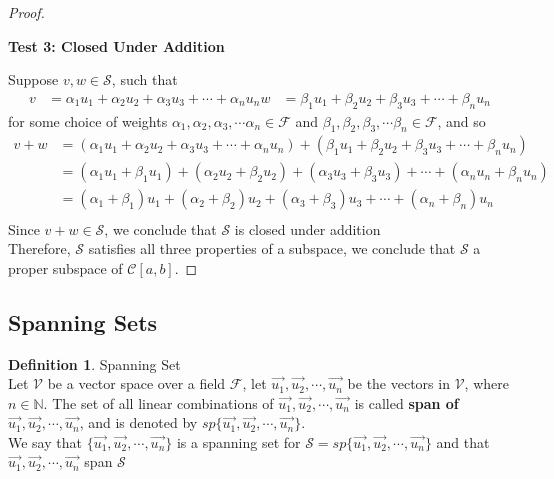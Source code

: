 \documentclass{book}
\theoremstyle{definition}
\newtheorem{definition}{Definition}[section]
\theoremstyle{remark}
\newcommand{\bb}[1]{\mathbb{#1}}
\newcommand{\cc}[1]{\mathcal{#1}}
\begin{document}
\begin{proof}
        \begin{flushleft} \textbf{Test 3: Closed Under Addition} \end{flushleft}
            Suppose $v, w \in \cc{S}$, such that 
                \begin{align*}
                    v & = \alpha_1 u_1 + \alpha_2 u_2 + \alpha_3 u_3 + \cdots + \alpha_n u_n
                    w & = \beta_1 u_1 + \beta_2 u_2 + \beta_3 u_3 + \cdots + \beta_n u_n
                \end{align*}
            for some choice of weights $\alpha_1, \alpha_2, \alpha_3, \cdots \alpha_n \in \cc{F}$ and $\beta_1, \beta_2, \beta_3, \cdots \beta_n \in \cc{F}$, and so
                \begin{align*}
                    v + w & = (\alpha_1 u_1 + \alpha_2 u_2 + \alpha_3 u_3 + \cdots + \alpha_n u_n) + (\beta_1 u_1 + \beta_2 u_2 + \beta_3 u_3 + \cdots + \beta_n u_n) \\
                        & = (\alpha_1 u_1 + \beta_1 u_1) + (\alpha_2 u_2 + \beta_2 u_2) + (\alpha_3 u_3 + \beta_3 u_3) + \cdots + (\alpha_n u_n + \beta_n u_n) \\
                        & = (\alpha_1 + \beta_1) u_1 + (\alpha_2 + \beta_2) u_2 + (\alpha_3 + \beta_3) u_3 + \cdots + (\alpha_n + \beta_n) u_n \\
                \end{align*}
            Since $v + w \in \cc{S}$, we conclude that $\cc{S}$ is closed under addition \\
        
        Therefore, $\cc{S}$ satisfies all three properties of a subspace, we conclude that $\cc{S}$ a proper subspace of $\cc{C}[a,b]$.
\end{proof}


\newpage
\subsection{Spanning Sets}

\begin{definition}
Spanning Set \\

Let $\cc{V}$ be a vector space over a field $\cc{F}$, let  $\vec{u_1}, \vec{u_2}, \cdots, \vec{u_n}$ be the vectors in $\cc{V}$, where $n \in \bb{N}$. The set of all linear combinations  of  $\vec{u_1}, \vec{u_2}, \cdots, \vec{u_n}$ is called \textbf{span of  $\vec{u_1}, \vec{u_2}, \cdots, \vec{u_n}$}, and is denoted by $sp\{\vec{u_1}, \vec{u_2}, \cdots, \vec{u_n} \}$. \\

We say that  $\{\vec{u_1}, \vec{u_2}, \cdots, \vec{u_n}\}$ is a spanning set for $\cc{S} = sp\{ \vec{u_1}, \vec{u_2}, \cdots, \vec{u_n} \}$ and that  $\vec{u_1}, \vec{u_2}, \cdots, \vec{u_n}$ span $\cc{S}$
\end{definition}
\end{document}
